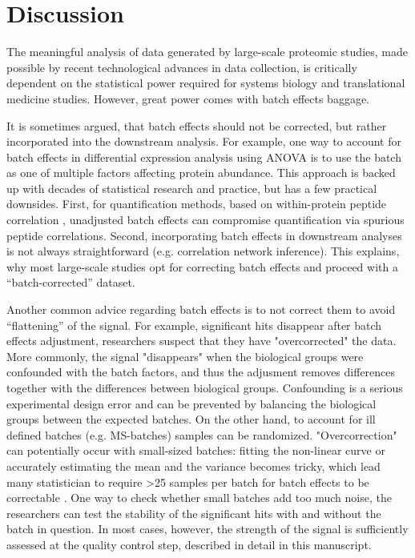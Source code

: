 \documentclass[num-refs]{wiley-article}
\begin{document}
\section{Discussion}

The meaningful analysis of data generated by large-scale proteomic studies, made possible by recent technological advances in data collection, is critically dependent on the statistical power required for systems biology and translational medicine studies. However, great power comes with batch effects baggage. 

It is sometimes argued, that batch effects should not be corrected, but rather incorporated into the downstream analysis. For example, one way to account for batch effects in differential expression analysis using ANOVA is to use the batch as one of multiple factors affecting protein abundance. This approach is backed up with decades of statistical research and practice, but has a few practical downsides. First, for quantification methods, based on within-protein peptide correlation \cite{Teo:2015aa}, unadjusted batch effects can compromise quantification via spurious peptide correlations. Second, incorporating batch effects in downstream analyses is not always straightforward (e.g. correlation network inference). This explains, why most large-scale studies opt for correcting batch effects and proceed with a “batch-corrected” dataset.

Another common advice regarding batch effects is to not correct them to avoid “flattening” of the signal. For example, significant hits disappear after batch effects adjustment, researchers suspect that they have "overcorrected" the data. More commonly, the signal "disappears" when the biological groups were confounded with the batch factors, and thus the adjusment removes differences together with the differences between biological groups. Confounding is a serious experimental design error and can be prevented by balancing the biological groups between the expected batches. On the other hand, to account for ill defined batches (e.g. MS-batches) samples can be randomized. "Overcorrection" can potentially occur with small-sized batches: fitting the non-linear curve or accurately estimating the mean and the variance becomes tricky, which lead many statistician to require >25 samples per batch for batch effects to be correctable \cite{Benito2004, Alter2000}. One way to check whether small batches add too much noise, the researchers can test the stability of the significant hits with and without the batch in question. In most cases, however, the strength of the signal is sufficiently assessed at the quality control step, described in detail in this manuscript.
\end{document}

